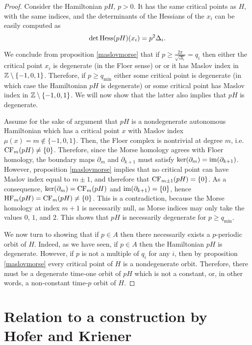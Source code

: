 \begin{proof}
Consider the Hamiltonian $p H$, $p > 0$. It has the same critical points as $H$, with the same indices, and the determinants of the Hessians of the $x_i$ can be easily computed as
\begin{equation}
\det \operatorname{Hess}(pH)(x_i) = p^2 \Delta_i.
\end{equation}

We conclude from proposition \ref{maslovmorse} that if $p \geq \frac{2\pi}{\sqrt{\Delta_i}} = q_i$ then either the critical point $x_i$ is degenerate (in the Floer sense) or or it has Maslov index in $\mathbb{Z} \setminus \{-1,0,1\}$. Therefore, if $p \geq q_{\min}$ either some critical point is degenerate (in which case the Hamiltonian $pH$ is degenerate) or some critical point has Maslov index in $\mathbb{Z} \setminus \{-1,0,1\}$. We will now show that the latter also implies that $pH$ is degenerate.

Assume for the sake of argument that $pH$ is a nondegenerate autonomous Hamiltonian which has a critical point $x$ with Maslov index $\mu(x) = m \not \in \{-1,0,1\}$. Then, the Floer complex is nontrivial at degree $m$, i.e. $\mathrm{CF}_m(pH) \neq \{0\}$. Therefore, since the Morse homology agrees with Floer homology, the boundary maps $\partial_m$ and $\partial_{k+1}$ must satisfy $\ker(\partial_m) = \operatorname{im}(\partial_{k+1})$. However, proposition \ref{maslovmorse} implies that no critical point can have Maslov index equal to $m \pm 1$, and therefore that $\mathrm{CF}_{m\pm1}(pH) = \{0\}$. As a consequence, $\ker(\partial_m) = \mathrm{CF}_m(pH)$ and $\operatorname{im}(\partial_{k+1}) = \{0\}$, hence $\mathrm{HF}_m(pH) = \mathrm{CF}_m(pH) \neq \{0\}$. This is a contradiction, because the Morse homology at index $m+1$ is necessarily null, as Morse indices may only take the values $0$, $1$, and $2$. This shows that $pH$ is necessarily degenerate for $p \geq q_{\min}$.

\smallskip

We now turn to showing that if $p \in A$ then there necessarily exists a $p$-periodic orbit of $H$. Indeed, as we have seen, if $p \in A$ then the Hamiltonian $pH$ is degenerate. However, if $p$ is not a multiple of $q_i$ for any $i$, then by proposition \ref{maslovmorse} every critical point of $H$ is a nondegenerate orbit. Therefore, there must be a degenerate time-one orbit of $pH$ which is not a constant, or, in other words, a non-constant time-$p$ orbit of $H$.
\end{proof}

\section{Relation to a construction by Hofer and Kriener}

